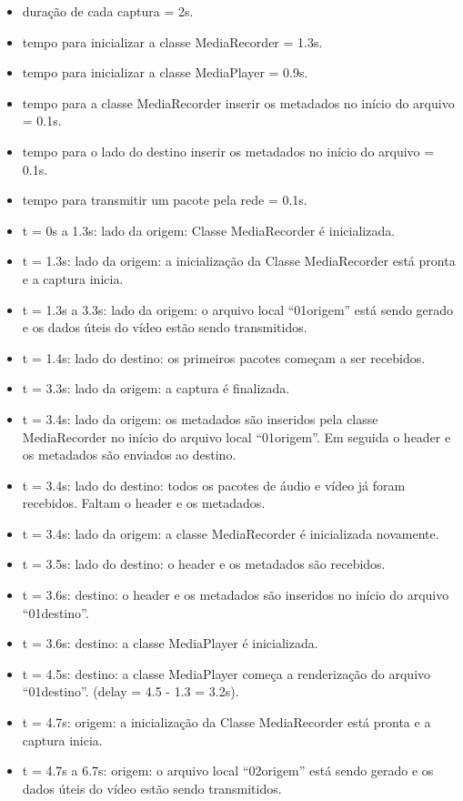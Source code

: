 \documentclass{acm_proc_article-sp}
\begin{document}
\begin{itemize}
 \item duração de cada captura = 2s.
 \item tempo para inicializar a classe MediaRecorder = 1.3s.
 \item tempo para inicializar a classe MediaPlayer = 0.9s.
 \item tempo para a classe MediaRecorder inserir os metadados no início do arquivo = 0.1s.
 \item tempo para o lado do destino inserir os metadados no início do arquivo = 0.1s.
 \item tempo para transmitir um pacote pela rede = 0.1s.
 \item t = 0s a 1.3s: lado da origem: Classe MediaRecorder é inicializada.
 \item t = 1.3s: lado da origem: a inicialização da Classe MediaRecorder está pronta e a captura inicia.
 \item t = 1.3s a 3.3s: lado da origem: o arquivo local “01origem” está sendo gerado e os dados úteis do vídeo estão sendo transmitidos.
 \item t = 1.4s: lado do destino: os primeiros pacotes começam a ser recebidos.
 \item t = 3.3s: lado da origem: a captura é finalizada.
 \item t = 3.4s: lado da origem: os metadados são inseridos pela classe MediaRecorder no início do arquivo local “01origem”. Em seguida o header e os metadados são enviados ao destino.
 \item t = 3.4s: lado do destino: todos os pacotes de áudio e vídeo já foram recebidos. Faltam o header e os metadados.
 \item t = 3.4s: lado da origem: a classe MediaRecorder é inicializada novamente.
 \item t = 3.5s: lado do destino: o header e os metadados são recebidos.
 \item t = 3.6s: destino: o header e os metadados são inseridos no início do arquivo “01destino”.
 \item t = 3.6s: destino: a classe MediaPlayer é inicializada.
 \item t = 4.5s: destino: a classe MediaPlayer começa a renderização do arquivo “01destino”. (delay = 4.5 - 1.3 = 3.2s).
 \item t = 4.7s: origem: a inicialização da Classe MediaRecorder está pronta e a captura inicia.
 \item t = 4.7s a 6.7s: origem: o arquivo local “02origem” está sendo gerado e os dados úteis do vídeo estão sendo transmitidos.

\end{itemize}
\end{document}
